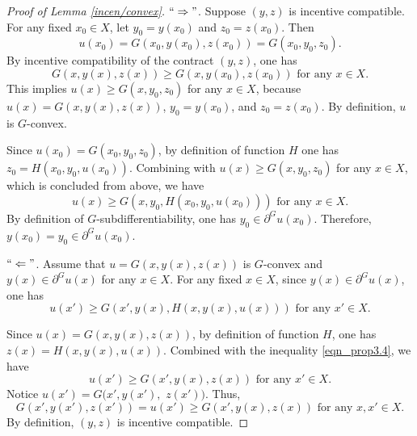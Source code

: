 \documentclass[a4paper, 11pt]{amsart}
\numberwithin{equation}{section}
\theoremstyle{plain}
\theoremstyle{definition}
\theoremstyle{remark}
\begin{document}
\vspace{0.3cm}
\begin{proof}[Proof of Lemma \ref{incen/convex}]
$``\Rightarrow"$. Suppose $(y,z)$ is incentive compatible. For any fixed $x_0 \in X$, let $y_0 = y(x_0)$ and $z_0 = z(x_0)$. Then 
$$u(x_0) = G(x_0, y(x_0), z(x_0)) = G(x_0, y_0, z_0).$$ 
By incentive compatibility of the contract $(y,z)$, one has 
$$G(x, y(x), z(x)) \ge G(x, y(x_0), z(x_0)) \text{ for any $x\in X$.}$$ This implies $u(x) \ge G(x,y_0,z_0)$ for any $x\in X$, because $u(x)= G(x, y(x), z(x))$,  $y_0 = y(x_0)$, and $z_0 = z(x_0)$. By definition, $u$ is $G$-convex. 

Since $u(x_0)=G(x_0, y_0, z_0)$, by definition of function $H$ one has $z_0 = H(x_0, y_0, u(x_0))$.  Combining with $u(x) \ge G(x, y_0, z_0)$ for any $x\in X$, which is concluded from above, we have 
$$u(x)\ge G(x, y_0, H(x_0, y_0, u(x_0))) \text{ for any $x\in X$.}$$ 
By definition of  $G$-subdifferentiability, one has $y_0 \in \partial^G u(x_0)$. Therefore, $y(x_0) = y_0 \in \partial^G u(x_0)$.

$``\Leftarrow"$. Assume that $u = G(x, y(x),z(x))$ is $G$-convex and $y(x)\in \partial^G u(x)$ for any $x\in X$. For any fixed $x \in X$, since $y(x)\in \partial^G u(x)$, one has 
\begin{equation}\label{eqn_prop3.4}
	u(x')\ge G(x', y(x), H(x, y(x), u(x))) \text{ for any $x'\in X$.}
\end{equation} 
 

Since $u(x) = G(x, y(x),z(x))$, by definition of function $H$, one has $z(x) = H(x,y(x), u(x))$. Combined with the inequality \eqref{eqn_prop3.4}, we have $$u(x')\ge G(x', y(x), z(x)) \text{ for any $x'\in X$.}$$ Notice $u(x') = G(x',y(x'),$ $z(x')) $. Thus, 
$$G(x',y(x'),z(x')) = u(x') \ge G(x', y(x), z(x)) \text{ for any $x, x'\in X$.}$$
By definition, $(y,z)$ is incentive compatible.
\end{proof}

\vspace{0.3cm}
\end{document}

